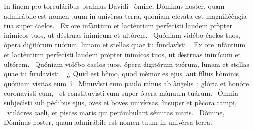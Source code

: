 { In finem pro torculáribus psalmus Davídi}
{%
~òmine, Dòminus noster, quam admirábile est nomen tuum in univèrsa terra, quóniam eleváta est magnifiċènçia tua super ċaelos.
~Ex ore infàntium et lactèntium perfeċìsti laudem pròpter inimícos tuos, ut déstruas inimícum et ultórem.
~Quóniam vidébo ċaelos tuos, ópera diġitórum tuórum, lunam et stellas quae tu fundavìsti.
~Ex ore infàntium et lactèntium perfeċìsti laudem pròpter inimícos tuos, ut déstruas inimícum et ultórem.
~Quóniam vidébo ċaelos tuos, ópera diġitórum tuórum, lunam et stellas quae tu fundavìsti.
~¿~Quid est hòmo, quod mèmor es ejus, aut fílius hòminis, quóniam vísitas eum~?
~Minuvìsti eum paulo mìnus ab ànġelïs~; glória et honóre coronavìsti eum,
~et constituvìsti eum super ópera mànuum tuárum.
~Òmnia subjeċìsti sub pèdibus ejus, oves et boves univèrsas, ìnsuper et pècora campi,
~vulácres ċaeli, et pìsċes maris qui perámbulant sémitas maris.
~Dòmine, Dòminus noster, quam admirábile est nomen tuum in univèrsa terra.
}
